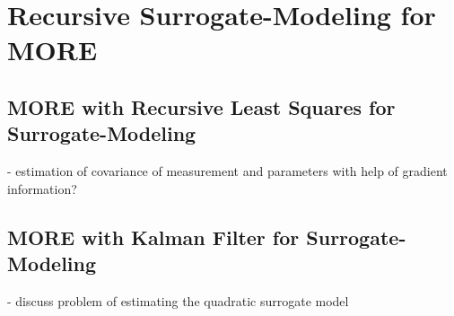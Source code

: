 
\chapter{Recursive Surrogate-Modeling for MORE}

\section{MORE with Recursive Least Squares for Surrogate-Modeling}

- estimation of covariance of measurement and parameters with help of gradient information?

\section{MORE with Kalman Filter for Surrogate-Modeling }

- discuss problem of estimating the quadratic surrogate model
